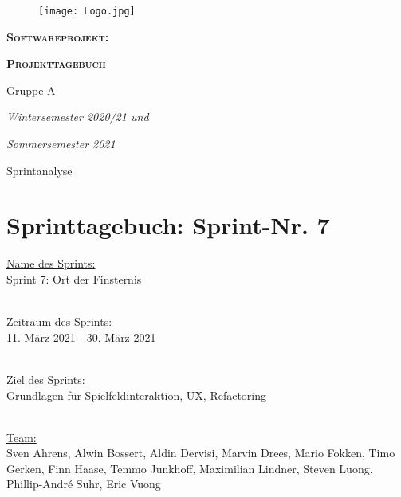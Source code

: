 \documentclass[12pt,a4paper, oneside]{article}
\author{Uni Oldenburg, SWP2020 Gruppe A}
\begin{document}
\begin{titlepage}									
\pagestyle{empty}									
\begin{center}

\begin{figure}[h]									
\centering											
\texttt{[image: Logo.jpg]}	
\end{figure}		

\bigskip \bigskip \noindent							
\textsc{\textbf{\LARGE Softwareprojekt:}} \par \bigskip \noindent																			
\textsc{\textbf{\LARGE Projekttagebuch}} 			    
													
													
\par \bigskip \bigskip \bigskip \bigskip \bigskip \noindent
{\Large Gruppe A} \par \medskip \noindent
		
\par \bigskip \bigskip \bigskip \bigskip \bigskip \bigskip \noindent																		
\textit{\Large Wintersemester 2020/21 und} \par \noindent
\textit{\Large Sommersemester 2021}				
													
\par \bigskip \bigskip \bigskip \bigskip \bigskip \bigskip \noindent			
\par \bigskip \bigskip \bigskip \noindent
{\Large Sprintanalyse} \par \medskip \noindent
		
\end{center}
\end{titlepage}

\tableofcontents
\pagebreak



\section{Sprinttagebuch: Sprint-Nr. 7}
\underline{Name des Sprints:}
\\
Sprint 7: Ort der Finsternis

\noindent
\\
\underline{Zeitraum des Sprints:} 
\\
11. März 2021 - 30. März 2021

\noindent 
\\
\underline{Ziel des Sprints:} 
\\
Grundlagen für Spielfeldinteraktion, UX, Refactoring


\noindent
\\
\underline {Team:} 
\\
Sven Ahrens, Alwin Bossert, Aldin Dervisi, Marvin Drees, Mario Fokken,
Timo Gerken, Finn Haase, Temmo Junkhoff, Maximilian Lindner, Steven Luong, Phillip-André Suhr, Eric Vuong
\end{document}

